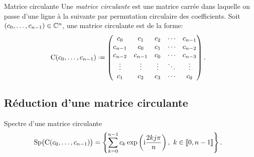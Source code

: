 \begin{defi}{Matrice circulante}
Une \emph{matrice circulante} est une matrice carrée dans laquelle on passe d'une ligne à la suivante par permutation circulaire des coefficients. Soit $(c_0, \dots, c_{n-1}) \in \mathbb{C}^n$, une matrice circulante est de la forme:
$$
\mathrm{C}(c_0, \dots, c_{n-1}) \defeq
\begin{pmatrix}
c_0 & c_1 & c_2 & \cdots & c_{n-1} \\
c_{n-1} & c_0 & c_1 & \cdots & c_{n-2} \\
c_{n-2} & c_{n-1} & c_0 & \cdots & c_{n-3} \\
\vdots & \vdots & \vdots & \ddots & \vdots \\
c_1 & c_2 & c_3 & \cdots & c_0
\end{pmatrix}.
$$
\end{defi}

\subsection{Réduction d'une matrice circulante}

\begin{prop}{Spectre d'une matrice circulante}
    $$\mathrm{Sp} \big( \mathrm{C}(c_0, \dots, c_{n-1}) \big) = \left \{ \sum_{k=0}^{n-1} c_k \exp \left( \mathrm{i} \frac{2kj \pi}{n} \right),\ k \in \llbracket 0, n-1 \rrbracket \right \}.$$
\end{prop}

